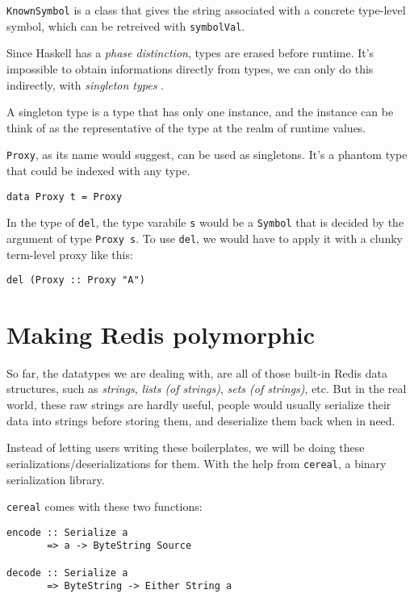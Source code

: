 \documentclass[pldi]{sigplanconf-pldi16}
\begin{document}
\texttt{KnownSymbol} is a class that gives the string associated
with a concrete type-level symbol, which can be retreived with
\texttt{symbolVal}.\footnotemark


Since Haskell has a \emph{phase distinction}\cite{phasedistinction}, types are
erased before runtime. It's impossible to obtain informations directly from
types, we can only do this indirectly, with \emph{singleton types}
\cite{singletons}.

A singleton type is a type that has only one instance, and the instance can be
think of as the representative of the type at the realm of runtime values.

\texttt{Proxy}, as its name would suggest, can be used as
singletons. It's a phantom type that could be indexed with any type.

\begin{verbatim}
data Proxy t = Proxy
\end{verbatim}

In the type of \texttt{del}, the type varabile
\texttt{s} would be a \texttt{Symbol} that is decided
 by the argument of type \texttt{Proxy s}.
To use \texttt{del}, we would have to apply it with a clunky
 term-level proxy like this:

\begin{verbatim}
del (Proxy :: Proxy "A")
\end{verbatim}

\section{Making Redis polymorphic}

So far, the datatypes we are dealing with, are all of those built-in Redis data
structures, such as \emph{strings}, \emph{lists (of strings)},
\emph{sets (of strings)}, etc.
But in the real world, these raw strings are hardly useful, people would
usually serialize their data into strings before storing them, and deserialize
them back when in need.

Instead of letting users writing these boilerplates, we will be doing these
serializations/deserializations for them. With the help from
\texttt{cereal}, a binary serialization library.

\texttt{cereal} comes with these two functions:
\begin{verbatim}
encode :: Serialize a
       => a -> ByteString Source

decode :: Serialize a
       => ByteString -> Either String a
\end{verbatim}
\end{document}
